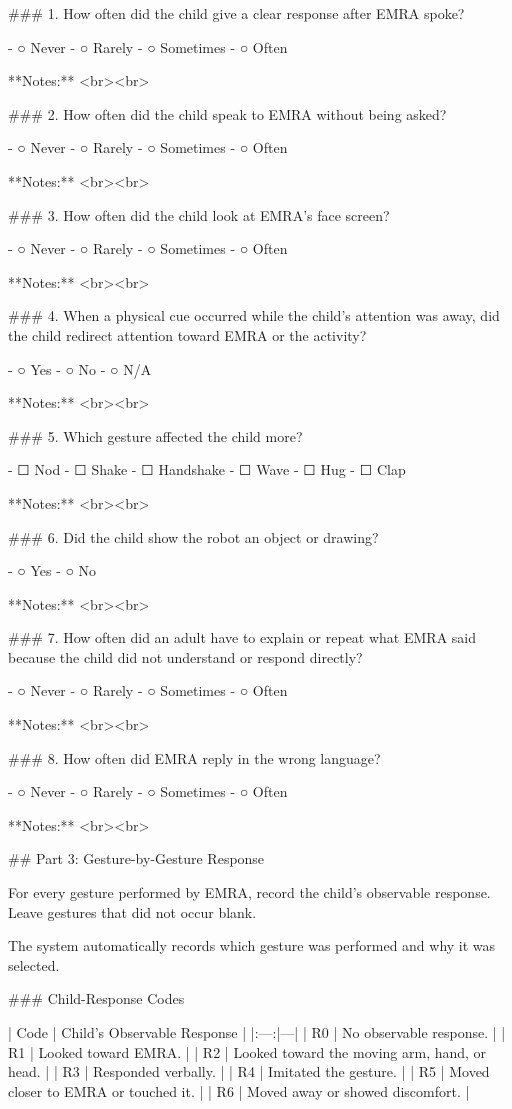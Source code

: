 ### 1. How often did the child give a clear response after EMRA spoke?

- ○ Never
- ○ Rarely
- ○ Sometimes
- ○ Often

**Notes:**  
<br><br>

### 2. How often did the child speak to EMRA without being asked?

- ○ Never
- ○ Rarely
- ○ Sometimes
- ○ Often

**Notes:**  
<br><br>

### 3. How often did the child look at EMRA’s face screen?

- ○ Never
- ○ Rarely
- ○ Sometimes
- ○ Often

**Notes:**  
<br><br>

### 4. When a physical cue occurred while the child’s attention was away, did the child redirect attention toward EMRA or the activity?

- ○ Yes
- ○ No
- ○ N/A

**Notes:**  
<br><br>

### 5. Which gesture affected the child more?

- ☐ Nod
- ☐ Shake
- ☐ Handshake
- ☐ Wave
- ☐ Hug
- ☐ Clap

**Notes:**  
<br><br>

### 6. Did the child show the robot an object or drawing?

- ○ Yes
- ○ No

**Notes:**  
<br><br>

### 7. How often did an adult have to explain or repeat what EMRA said because the child did not understand or respond directly?

- ○ Never
- ○ Rarely
- ○ Sometimes
- ○ Often

**Notes:**  
<br><br>

### 8. How often did EMRA reply in the wrong language?

- ○ Never
- ○ Rarely
- ○ Sometimes
- ○ Often

**Notes:**  
<br><br>

## Part 3: Gesture-by-Gesture Response

For every gesture performed by EMRA, record the child’s observable response. Leave gestures that did not occur blank.

The system automatically records which gesture was performed and why it was selected.

### Child-Response Codes

| Code | Child’s Observable Response |
|:---:|---|
| R0 | No observable response. |
| R1 | Looked toward EMRA. |
| R2 | Looked toward the moving arm, hand, or head. |
| R3 | Responded verbally. |
| R4 | Imitated the gesture. |
| R5 | Moved closer to EMRA or touched it. |
| R6 | Moved away or showed discomfort. |

